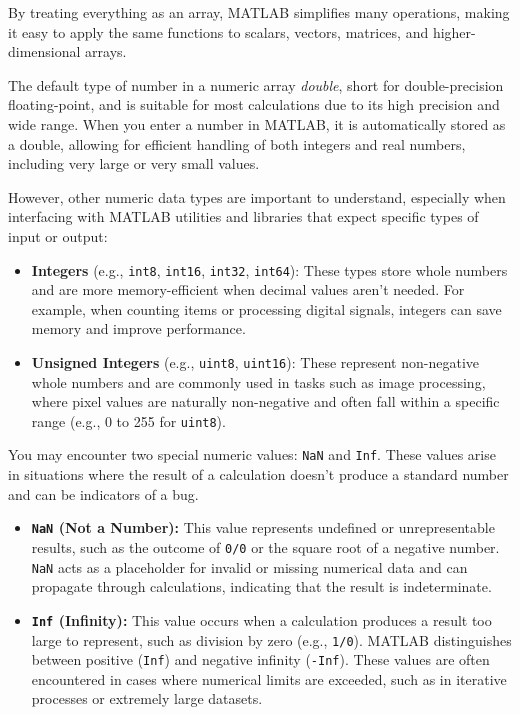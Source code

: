 By treating everything as an array, MATLAB simplifies many operations, making it easy to apply the same functions to scalars, vectors, matrices, and higher-dimensional arrays. 

The default type of number in a numeric array  \emph{double}, short for double-precision floating-point, and is suitable for most calculations due to its high precision and wide range. When you enter a number in MATLAB, it is automatically stored as a double, allowing for efficient handling of both integers and real numbers, including very large or very small values.

However, other numeric data types are important to understand, especially when interfacing with MATLAB utilities and libraries that expect specific types of input or output:

\begin{itemize}
    \item \textbf{Integers} (e.g., \texttt{int8}, \texttt{int16}, \texttt{int32}, \texttt{int64}): These types store whole numbers and are more memory-efficient when decimal values aren’t needed. For example, when counting items or processing digital signals, integers can save memory and improve performance.

    \item \textbf{Unsigned Integers} (e.g., \texttt{uint8}, \texttt{uint16}): These represent non-negative whole numbers and are commonly used in tasks such as image processing, where pixel values are naturally non-negative and often fall within a specific range (e.g., 0 to 255 for \texttt{uint8}).
\end{itemize}

You may encounter two special numeric values: \texttt{NaN} and \texttt{Inf}. These values arise in situations where the result of a calculation doesn’t produce a standard number and can be indicators of a bug.

\begin{itemize}
    \item \textbf{\texttt{NaN} (Not a Number):} This value represents undefined or unrepresentable results, such as the outcome of \texttt{0/0} or the square root of a negative number. \texttt{NaN} acts as a placeholder for invalid or missing numerical data and can propagate through calculations, indicating that the result is indeterminate.

    \item \textbf{\texttt{Inf} (Infinity):} This value occurs when a calculation produces a result too large to represent, such as division by zero (e.g., \texttt{1/0}). MATLAB distinguishes between positive (\texttt{Inf}) and negative infinity (\texttt{-Inf}). These values are often encountered in cases where numerical limits are exceeded, such as in iterative processes or extremely large datasets.
\end{itemize}


